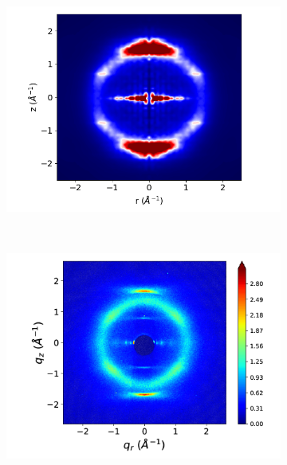 \documentclass{article}
\begin{document}
  \begin{figure}
  \begin{subfigure}{0.3\linewidth}
        \centering
	\vspace{-0.2em}
        \includegraphics[width=1.018\linewidth]{layered_rzplot.png}
        \caption{}~\label{fig:rz_layered}
  \end{subfigure}
  \begin{subfigure}{0.3\linewidth}
        \centering
	\vspace{0.25em}
        \includegraphics[scale=0.0987]{WAXS_raw.png}
        \caption{}~\label{fig:raw_waxs}
  \end{subfigure}
  \begin{subfigure}{0.3\linewidth}
        \centering

\end{subfigure}
\end{figure}
\end{document}
